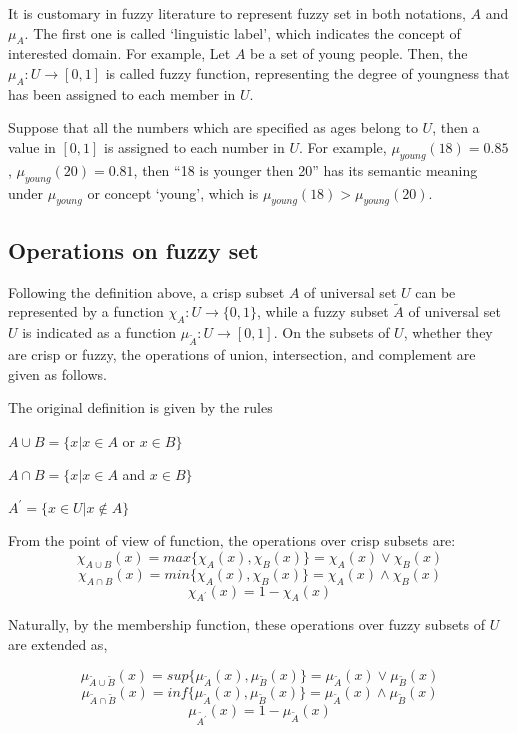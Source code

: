 It is customary in fuzzy literature to represent fuzzy set in both notations, $A$ and $\mu_A$. The first one is called `linguistic label', which indicates the concept of interested domain. For example, Let $A$ be a set of young people. Then, the $\mu_A : U \rightarrow [0,1]$ is called fuzzy function, representing the degree of youngness that has been assigned to each member in $U$.  

Suppose that all the numbers which are specified as ages belong to $U$, then a value in $[0,1]$ is assigned to each number in $U$. For example, $\mu_{young}(18)=0.85$, $\mu_{young}(20)=0.81$, then ``18 is younger then 20'' has its semantic meaning under $\mu_{young}$ or concept `young', which is $\mu_{young}(18) > \mu_{young}(20)$.

\subsection{Operations on fuzzy set}
\label{sec:OperationOnFuzzySet}
Following the definition above, a crisp subset $A$ of universal set $U$ can be represented by a function $\chi_A : U \rightarrow \{0,1\}$, while a fuzzy subset $\tilde{A}$ of universal set $U$ is indicated as a function $\mu_{\tilde{A}} : U \rightarrow [0,1]$. On the subsets of $U$, whether they are crisp or fuzzy, the operations of union, intersection, and complement are given as follows.

The original definition is given by the rules
\begin{center}
$A \cup B = \{x|x \in A$ or $x \in B\}$

$A \cap B = \{x|x \in A$ and $x \in B\}$

$A^{'} = \{x \in U | x \notin A\}$
\end{center}

From the point of view of function, the operations over crisp subsets are:
\[\chi_{A \cup B}(x) = max\{\chi_A(x),\chi_B(x)\} = \chi_A(x) \vee \chi_B(x)\] 
\[\chi_{A \cap B}(x) = min\{\chi_A(x),\chi_B(x)\} = \chi_A(x) \wedge \chi_B(x)\]
\[\chi_{A^{'}}(x) = 1 - \chi_A(x)\] 

Naturally, by the membership function, these operations over fuzzy subsets of $U$ are extended as,

\[\mu_{\tilde{A} \cup \tilde{B}}(x) = sup\{\mu_{\tilde{A}}(x),\mu_{\tilde{B}}(x)\}=\mu_{\tilde{A}}(x) \vee \mu_{\tilde{B}}(x)\]
\[\mu_{\tilde{A} \cap \tilde{B}}(x) = inf\{\mu_{\tilde{A}}(x),\mu_{\tilde{B}}(x)\}=\mu_{\tilde{A}}(x) \wedge \mu_{\tilde{B}}(x)\]
\[\mu_{\tilde{A^{'}}}(x) = 1 - \mu_{\tilde{A}}(x)\]

